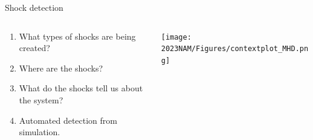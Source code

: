 \documentclass[10pt,aspectratio=169,usenames,dvipsnames]{beamer}
\begin{document}
\begin{frame}{Shock detection}
\begin{columns}
\begin{column}{0.3\textwidth}
\begin{enumerate}
\item What types of shocks are being created?
\item Where are the shocks?
\item What do the shocks tell us about the system?
\item Automated detection from simulation.
\end{enumerate}
\end{column}
\begin{column}{0.7\textwidth}
\texttt{[image: 2023NAM/Figures/contextplot\_MHD.png]}
\end{column}
\end{columns}
\end{frame}
\end{document}
